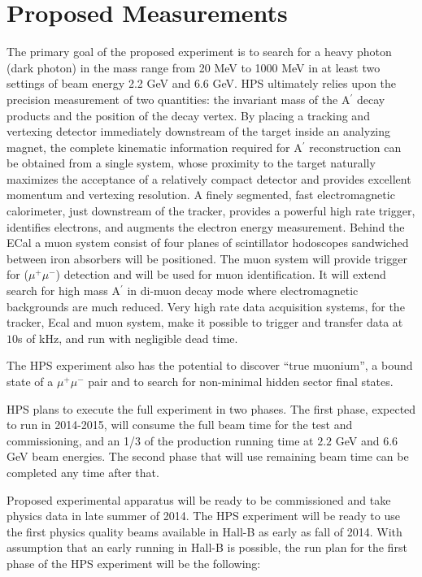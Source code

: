 \section{Proposed Measurements}
\label{sec:measurements}

The primary goal of the proposed experiment is to search for a heavy photon (dark photon) in the mass range from 20 MeV to 1000 MeV in at least two settings of beam energy 2.2 GeV and 6.6 GeV. 
HPS  ultimately relies upon the precision measurement of two quantities: the invariant mass of the A$^\prime$ decay products and the position of the decay vertex. By placing a tracking and vertexing detector immediately downstream of the target inside an analyzing magnet, the complete kinematic information required for A$^\prime$ reconstruction can be obtained from a single system, whose proximity to the target naturally maximizes the acceptance of a relatively compact detector and provides excellent momentum and vertexing resolution. A finely segmented, fast electromagnetic calorimeter, just downstream of the tracker,  provides a powerful high rate trigger, identifies electrons, and augments  the electron energy measurement. Behind the ECal a muon system consist of four planes of scintillator hodoscopes sandwiched between iron absorbers will be positioned. The muon system will provide trigger for ($\mu^+\mu^-$) detection and will be used for muon identification. It will extend search for high mass A$^\prime$ in di-muon decay mode where electromagnetic backgrounds are much reduced. Very high rate data acquisition systems, for the tracker, Ecal and muon system, make it possible to trigger and transfer data at $10$s of kHz, and run with negligible dead time.

The HPS experiment also has the potential to discover ``true muonium'', a bound state of a $\mu^+ \mu^-$ pair and to search for non-minimal hidden sector final states.  

HPS plans to execute the full experiment in two phases. The first phase, expected to run in 2014-2015, will consume the full beam time for the test and commissioning, and an 1/3 of the production running time at $2.2$ GeV and $6.6$ GeV beam energies. The second phase that will use remaining beam time can be completed any time after that.  

Proposed experimental apparatus will be ready to be commissioned and take physics data in late summer of 2014. The HPS experiment will be ready to use the first physics quality beams available in Hall-B as early as fall of 2014. With assumption that an early running in Hall-B is possible, the run plan for the first phase of the HPS experiment will be the following: 

